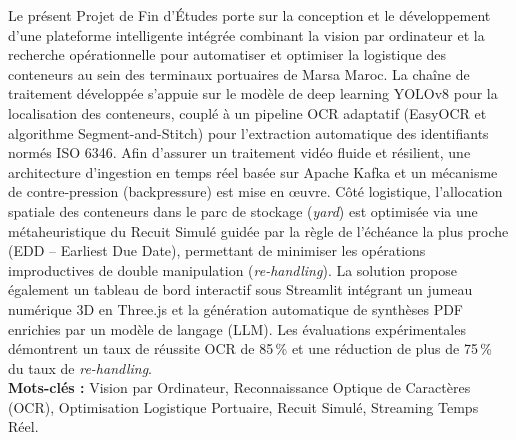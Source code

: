 \documentclass[12pt,a4paper]{article}
\begin{document}
\begin{tcolorbox}[colframe=MarsaBlue, colback=white, title=\textbf{Résumé (Français)}, arc=4pt]
Le présent Projet de Fin d'Études porte sur la conception et le développement d'une plateforme intelligente intégrée combinant la vision par ordinateur et la recherche opérationnelle pour automatiser et optimiser la logistique des conteneurs au sein des terminaux portuaires de Marsa Maroc. La chaîne de traitement développée s'appuie sur le modèle de deep learning YOLOv8 pour la localisation des conteneurs, couplé à un pipeline OCR adaptatif (EasyOCR et algorithme Segment-and-Stitch) pour l'extraction automatique des identifiants normés ISO 6346. Afin d'assurer un traitement vidéo fluide et résilient, une architecture d'ingestion en temps réel basée sur Apache Kafka et un mécanisme de contre-pression (backpressure) est mise en œuvre. Côté logistique, l'allocation spatiale des conteneurs dans le parc de stockage (\textit{yard}) est optimisée via une métaheuristique du Recuit Simulé guidée par la règle de l'échéance la plus proche (EDD -- Earliest Due Date), permettant de minimiser les opérations improductives de double manipulation (\textit{re-handling}). La solution propose également un tableau de bord interactif sous Streamlit intégrant un jumeau numérique 3D en Three.js et la génération automatique de synthèses PDF enrichies par un modèle de langage (LLM). Les évaluations expérimentales démontrent un taux de réussite OCR de 85\,\% et une réduction de plus de 75\,\% du taux de \textit{re-handling}.
\\[6pt]
\textbf{Mots-clés :} Vision par Ordinateur, Reconnaissance Optique de Caractères (OCR), Optimisation Logistique Portuaire, Recuit Simulé, Streaming Temps Réel.
\end{tcolorbox}

\vspace{0.8cm}
\end{document}
